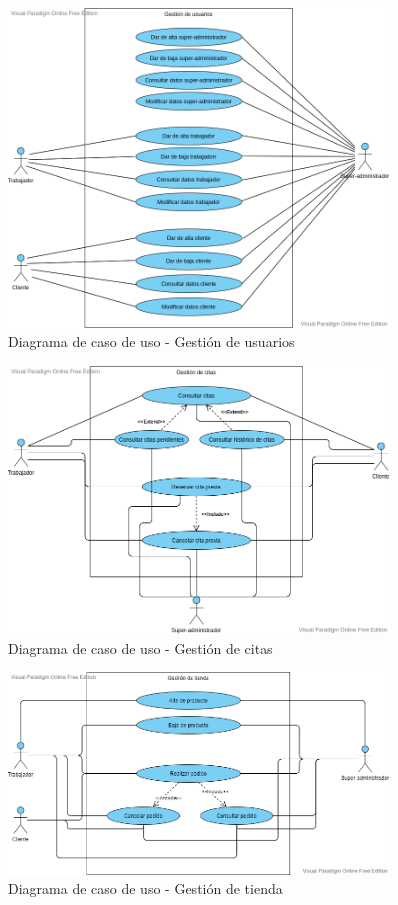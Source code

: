 \begin{figure}[H]
    \centering
    \includegraphics[width=0.9\textwidth]{images/Gestion_Usuarios.png}
    \caption{Diagrama de caso de uso - Gestión de usuarios}
    \label{CU1}
\end{figure}

\begin{figure}[H]
    \centering
    \includegraphics[width=0.9\textwidth]{images/Gestion_Citas.png}
    \caption{Diagrama de caso de uso - Gestión de citas}
    \label{CU1}
\end{figure}

\begin{figure}[H]
    \centering
    \includegraphics[width=0.9\textwidth]{images/Gestion_Tienda.png}
    \caption{Diagrama de caso de uso - Gestión de tienda}
    \label{CU1}
\end{figure}

